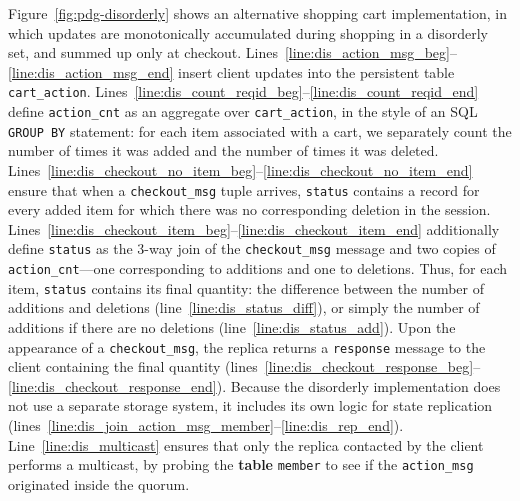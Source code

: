 Figure~\ref{fig:pdg-disorderly} shows an alternative shopping cart
implementation, in which updates are monotonically accumulated during shopping
in a disorderly set, and summed up only at checkout.
Lines~\ref{line:dis_action_msg_beg}--\ref{line:dis_action_msg_end} insert client updates into the persistent
table \texttt{cart\_action}.  Lines~\ref{line:dis_count_reqid_beg}--\ref{line:dis_count_reqid_end} define
\texttt{action\_cnt} as an aggregate over \texttt{cart\_action}, in the style
of an SQL \texttt{GROUP BY} statement: for each item associated with a cart, we
separately count the number of times it was added and the number of times it
was deleted.
Lines~\ref{line:dis_checkout_no_item_beg}--\ref{line:dis_checkout_no_item_end}
ensure that when a \texttt{checkout\_msg} tuple arrives, \texttt{status}
contains a record for every added item for which there was no corresponding
deletion in the session.
Lines~\ref{line:dis_checkout_item_beg}--\ref{line:dis_checkout_item_end}
additionally define \texttt{status} as the 3-way join of the
\texttt{checkout\_msg} message and two copies of \texttt{action\_cnt}---one
corresponding to additions and one to deletions.  Thus, for each item,
\texttt{status} contains its final quantity: the difference between the number
of additions and deletions (line~\ref{line:dis_status_diff}), or simply the
number of additions if there are no deletions (line~\ref{line:dis_status_add}).
Upon the appearance of a \texttt{checkout\_msg}, the replica returns a
\texttt{response} message to the client containing the final quantity
(lines~\ref{line:dis_checkout_response_beg}--\ref{line:dis_checkout_response_end}).
Because the disorderly implementation does not use a separate storage system,
it includes its own logic for state replication
(lines~\ref{line:dis_join_action_msg_member}--\ref{line:dis_rep_end}).
Line~\ref{line:dis_multicast} ensures that only the replica contacted by the
client performs a multicast, by probing the \textbf{table} \texttt{member} to
see if the \texttt{action\_msg} originated inside the quorum.

